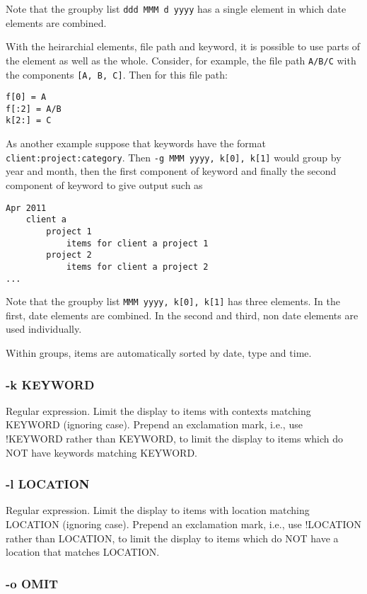 \documentclass[]{article}
\begin{document}
Note that the groupby list \texttt{ddd MMM d yyyy} has a single element
in which date elements are combined.

With the heirarchial elements, file path and keyword, it is possible to
use parts of the element as well as the whole. Consider, for example,
the file path \texttt{A/B/C} with the components \texttt{{[}A, B, C{]}}.
Then for this file path:

\begin{verbatim}
f[0] = A
f[:2] = A/B
k[2:] = C
\end{verbatim}

As another example suppose that keywords have the format
\texttt{client:project:category}. Then
\texttt{-g MMM yyyy, k{[}0{]}, k{[}1{]}} would group by year and month,
then the first component of keyword and finally the second component of
keyword to give output such as

\begin{verbatim}
Apr 2011
    client a
        project 1
            items for client a project 1
        project 2
            items for client a project 2
...
\end{verbatim}

Note that the groupby list \texttt{MMM yyyy, k{[}0{]}, k{[}1{]}} has
three elements. In the first, date elements are combined. In the second
and third, non date elements are used individually.

Within groups, items are automatically sorted by date, type and time.

\subsubsection{-k KEYWORD}

Regular expression. Limit the display to items with contexts matching
KEYWORD (ignoring case). Prepend an exclamation mark, i.e., use !KEYWORD
rather than KEYWORD, to limit the display to items which do NOT have
keywords matching KEYWORD.

\subsubsection{-l LOCATION}

Regular expression. Limit the display to items with location matching
LOCATION (ignoring case). Prepend an exclamation mark, i.e., use
!LOCATION rather than LOCATION, to limit the display to items which do
NOT have a location that matches LOCATION.

\subsubsection{-o OMIT}
\end{document}
